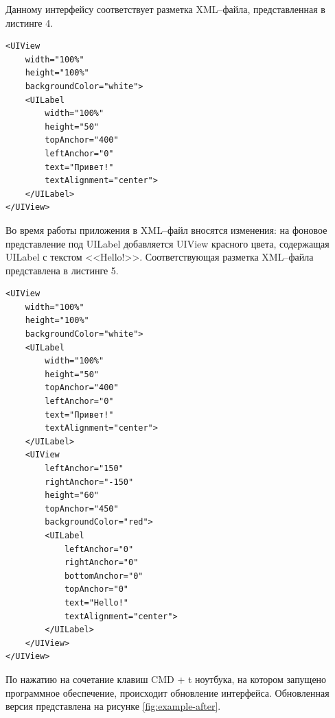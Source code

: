 Данному интерфейсу соответствует разметка XML--файла, представленная в листинге 4. 

\begin{lstlisting}[caption={Разметка XML--файла после внесения изменений}]
<UIView
    width="100%"
    height="100%"
    backgroundColor="white">
    <UILabel
        width="100%"
        height="50"
        topAnchor="400"
        leftAnchor="0"
        text="Привет!"
        textAlignment="center">
    </UILabel>
</UIView>
\end{lstlisting}

Во время работы приложения в XML--файл вносятся изменения: на фоновое представление под UILabel добавляется UIView красного цвета, содержащая UILabel с текстом <<Hello!>>. Соответствующая разметка XML--файла представлена в листинге 5. 

\begin{lstlisting}[caption={Разметка XML--файла до внесения изменений}]
<UIView
    width="100%"
    height="100%"
    backgroundColor="white">
    <UILabel
        width="100%"
        height="50"
        topAnchor="400"
        leftAnchor="0"
        text="Привет!"
        textAlignment="center">
    </UILabel>
    <UIView
        leftAnchor="150"
        rightAnchor="-150"
        height="60"
        topAnchor="450"
        backgroundColor="red">
        <UILabel
            leftAnchor="0"
            rightAnchor="0"
            bottomAnchor="0"
            topAnchor="0"
            text="Hello!"
            textAlignment="center">
        </UILabel>
    </UIView>
</UIView>
\end{lstlisting}

По нажатию на сочетание клавиш CMD + t ноутбука, на котором запущено программное обеспечение, происходит обновление интерфейса. 
Обновленная версия представлена на рисунке \ref{fig:example-after}.

